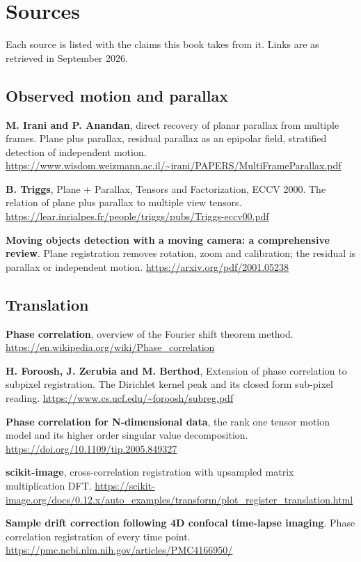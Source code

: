 \chapter{Sources}

Each source is listed with the claims this book takes from it. Links are as retrieved in September
2026.

\section*{Observed motion and parallax}

\textbf{M. Irani and P. Anandan}, direct recovery of planar parallax from multiple frames. Plane plus
parallax, residual parallax as an epipolar field, stratified detection of independent motion.
\url{https://www.wisdom.weizmann.ac.il/~irani/PAPERS/MultiFrameParallax.pdf}

\textbf{B. Triggs}, Plane + Parallax, Tensors and Factorization, ECCV 2000. The relation of plane plus
parallax to multiple view tensors.
\url{https://lear.inrialpes.fr/people/triggs/pubs/Triggs-eccv00.pdf}

\textbf{Moving objects detection with a moving camera: a comprehensive review}. Plane registration
removes rotation, zoom and calibration; the residual is parallax or independent motion.
\url{https://arxiv.org/pdf/2001.05238}

\section*{Translation}

\textbf{Phase correlation}, overview of the Fourier shift theorem method.
\url{https://en.wikipedia.org/wiki/Phase_correlation}

\textbf{H. Foroosh, J. Zerubia and M. Berthod}, Extension of phase correlation to subpixel
registration. The Dirichlet kernel peak and its closed form sub-pixel reading.
\url{https://www.cs.ucf.edu/~foroosh/subreg.pdf}

\textbf{Phase correlation for N-dimensional data}, the rank one tensor motion model and its higher
order singular value decomposition. \url{https://doi.org/10.1109/tip.2005.849327}

\textbf{scikit-image}, cross-correlation registration with upsampled matrix multiplication DFT.
\url{https://scikit-image.org/docs/0.12.x/auto_examples/transform/plot_register_translation.html}

\textbf{Sample drift correction following 4D confocal time-lapse imaging}. Phase correlation
registration of every time point.
\url{https://pmc.ncbi.nlm.nih.gov/articles/PMC4166950/}

